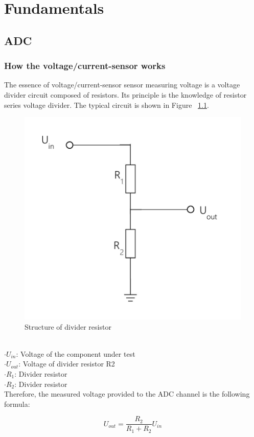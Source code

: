 \chapter{Fundamentals}
\label{chap:Fundamentals}

\section{ADC}
\label{sec:ADC}


\subsection{How the voltage/current-sensor works}
\label{sec:How the voltage/current-sensor works}

The essence of voltage/current-sensor sensor measuring voltage is a voltage divider circuit composed of resistors. Its principle is the knowledge of resistor series voltage divider. The typical circuit is shown in Figure ~\ref{fig:2.1}. 
\begin{figure}[h]
	\centering
	\includegraphics[width=13cm]{grafiken/2.1.pdf}
	\caption{Structure of divider resistor} 
	\label{fig:2.1}
\end{figure}
\\
$\cdot U_{in}$: Voltage of the component under test
\\
$\cdot U_{out}$: Voltage of divider resistor R2
\\
$\cdot R_{1}$: Divider resistor
\\
$\cdot R_{2}$: Divider resistor
\\
Therefore, the measured voltage provided to the ADC channel is the following formula:
\\
\begin{center} 
\begin{equation}
 U_{out} = \frac{R_{2}}{R_{1}+R_{2}} U_{in}  
\end{equation}
\end{center}

